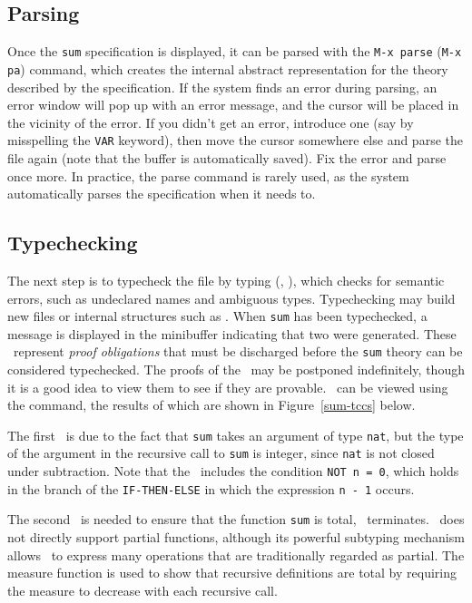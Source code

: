 \subsection{Parsing}

Once the {\tt sum} specification is displayed, it can be parsed with the
{\tt M-x parse} ({\tt M-x pa}) command, which creates the internal
abstract representation for the theory described by the specification.
If the system finds an error during parsing, an error window will pop up
with an error message, and the cursor will be placed in the vicinity of
the error.  If you didn't get an error, introduce one (say by
misspelling the {\tt VAR} keyword), then move the cursor somewhere else and
parse the file again (note that the buffer is automatically saved).  Fix
the error and parse once more.  In practice, the parse command is rarely
used, as the system automatically parses the specification when it needs
to.

\subsection{Typechecking}

The next step is to typecheck the file by typing 
(, ), which checks for semantic errors, such as
undeclared names and ambiguous types.  Typechecking may build new files
or internal structures such as \tccs.  When {\tt sum} has been
typechecked, a message is displayed in the minibuffer indicating that
two \tccs{} were generated.  These \tccs\ represent
{\em proof obligations\/} that must be discharged before the {\tt sum}
theory can be considered typechecked.  The proofs of the \tccs\
may be postponed indefinitely, though it is a good idea to view them to
see if they are provable.  \tccs\ can be viewed using the 
command, the results of which are shown in Figure~\ref{sum-tccs} below.


The first \tcc\ is due to the fact that {\tt sum} takes an argument of
type {\tt nat}, but the type of the argument in the recursive call to
{\tt sum} is integer, since {\tt nat} is not closed under subtraction.
Note that the \tcc\ includes the condition {\tt NOT n = 0}, which holds
in the branch of the {\tt IF-THEN-ELSE} in which the expression
{\tt n - 1} occurs.

The second \tcc\ is needed to ensure that the function {\tt sum} is
total, \ie\ terminates.  \pvs\ does not directly support partial
functions, although its powerful subtyping mechanism allows \pvs\ to
express many operations that are traditionally regarded as partial.  The
measure function is used to show that recursive definitions are total by
requiring the measure to decrease with each recursive call.

